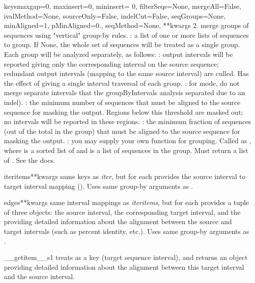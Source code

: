 \documentclass{howto}
\begin{document}
\begin{funcdesc}{keys}{maxgap=0, maxinsert=0, mininsert= 0, filterSeqs=None, mergeAll=False, ivalMethod=None, sourceOnly=False, indelCut=False, seqGroups=None, minAligned=1, pMinAligned=0., seqMethod=None, **kwargs}
  2. merge groups of sequences using "vertical" group-by rules.
  : a list of one or more lists of sequences to group.
  If None, the whole set of sequences will be treated as a single group.
  Each group will be analyzed separately, as follows:
  : output intervals will be reported giving only
  the corresponding interval on the source sequence; redundant
  output intervals (mapping to the same source interval) are
  culled.  Has the effect of giving a single interval traversal
  of each group.
  : for  mode, do not merge separate 
  intervals that the groupByIntervals analysis separated due to an indel).
  : the minimum number of sequences that must be aligned to
  the source sequence for masking the output.  Regions below
  this threshold are masked out; no intervals will be reported
  in these regions.
  : the minimum fraction of sequences (out of the
  total in the group) that must be aligned to the source
  sequence for masking the output.
  : you may supply your own function for grouping.
  Called as , where
   is a sorted list of
  and  is a list of sequences in the group.
  Must return a list of .  See the docs.

\end{funcdesc}


\begin{funcdesc}{iteritems}{**kwargs}
  same keys as {\em iter}, but for each provides the source interval
  to target interval mapping ().
  Uses same group-by arguments as .
\end{funcdesc}


\begin{funcdesc}{edges}{**kwargs}
  same interval mappings as {\em iteritems}, but for
  each provides a tuple of three objects:
  the source interval, the corresponding target interval,
  and the  providing detailed
  information about the alignment between the source and target intervals
  (such as percent identity, etc.).
  Uses same group-by arguments as .
\end{funcdesc}


\begin{funcdesc}{__getitem__}{s1}
  treats  as a key (target sequence
  interval), and returns an  object providing detailed
  information about the alignment between this target interval
  and the source interval.
\end{funcdesc}
\end{document}
